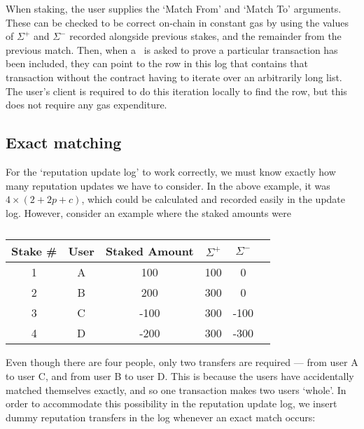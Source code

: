 When staking, the user supplies the `Match From' and `Match To' arguments. These can be checked to be correct on-chain in constant gas by using the values of $\Sigma^+$ and $\Sigma^-$ recorded alongside previous stakes, and the remainder from the previous match. Then, when a \rcth\ is asked to prove a particular transaction has been included, they can point to the row in this log that contains that transaction without the contract having to iterate over an arbitrarily long list. The user's client is required to do this iteration locally to find the row, but this does not require any gas expenditure.

\subsection{Exact matching}\label{sec:exactMatching}

For the `reputation update log' to work correctly, we must know exactly how many reputation updates we have to consider. In the above example, it was $4\times (2+2p+c)$, which could be calculated and recorded easily in the update log. However, consider an example where the staked amounts were

\begin{table}[ht]
\centering
\caption{}
\begin{tabular}{|c|c|c|c|c|c|}
\hline
Stake \# & User  & Staked Amount & $\Sigma^+$ & $\Sigma^-$ \\ \hline
1 & A & 100           & 100                      & 0                                                                       \\ \hline
2 & B & 200           & 300                      & 0                                                                       \\ \hline
3 & C & -100           & 300                      & -100                                                                       \\ \hline
4 & D & -200          & 300                      & -300                                                                    \\ \hline
\end{tabular}
\end{table}

Even though there are four people, only two transfers are required --- from user A to user C, and from user B to user D. This is because the users have accidentally matched themselves exactly, and so one transaction makes two users `whole'. In order to accommodate this possibility in the reputation update log, we insert dummy reputation transfers in the log whenever an exact match occurs:

